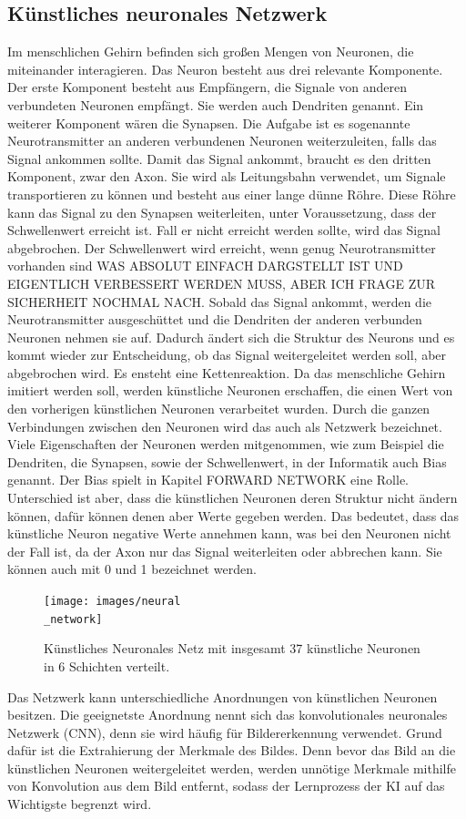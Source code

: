 \documentclass[11pt]{article}
\begin{document}
\subsection{Künstliches neuronales Netzwerk}
Im menschlichen Gehirn befinden sich großen Mengen von Neuronen, die miteinander interagieren. 
Das Neuron besteht aus drei relevante Komponente. Der erste Komponent besteht aus Empfängern, die Signale von anderen verbundeten Neuronen empfängt.
Sie werden auch Dendriten genannt. Ein weiterer Komponent wären die Synapsen. Die Aufgabe ist es sogenannte Neurotransmitter an anderen verbundenen Neuronen
weiterzuleiten, falls das Signal ankommen sollte. Damit das Signal ankommt, braucht es den dritten Komponent, zwar den Axon. Sie wird als Leitungsbahn
verwendet, um Signale transportieren zu können und besteht aus einer lange dünne Röhre. Diese Röhre kann das Signal zu den Synapsen weiterleiten, unter Voraussetzung, dass der Schwellenwert erreicht ist.
Fall er nicht erreicht werden sollte, wird das Signal abgebrochen. Der Schwellenwert wird erreicht, wenn genug Neurotransmitter vorhanden sind
WAS ABSOLUT EINFACH DARGSTELLT IST UND EIGENTLICH VERBESSERT WERDEN MUSS, ABER ICH FRAGE ZUR SICHERHEIT NOCHMAL NACH. Sobald das Signal ankommt, werden die Neurotransmitter ausgeschüttet und die Dendriten der anderen verbunden Neuronen nehmen sie auf.
Dadurch ändert sich die Struktur des Neurons und es kommt wieder zur Entscheidung, ob das Signal weitergeleitet werden soll, aber abgebrochen wird.
Es ensteht eine Kettenreaktion.
Da das menschliche Gehirn imitiert werden soll, werden künstliche Neuronen erschaffen, die einen Wert von den vorherigen künstlichen Neuronen verarbeitet wurden.
Durch die ganzen Verbindungen zwischen den Neuronen wird das auch als Netzwerk bezeichnet. Viele Eigenschaften der Neuronen werden mitgenommen, wie zum Beispiel die Dendriten, die Synapsen, sowie
der Schwellenwert, in der Informatik auch Bias genannt. Der Bias spielt in Kapitel FORWARD NETWORK eine Rolle. Unterschied ist aber,
dass die künstlichen Neuronen deren Struktur nicht ändern können, dafür können denen aber Werte gegeben werden. Das bedeutet, dass das künstliche Neuron
negative Werte annehmen kann, was bei den Neuronen nicht der Fall ist, da der Axon nur das Signal weiterleiten oder abbrechen kann. Sie können auch mit 0 und 1 bezeichnet werden.
\begin{figure}[h]
    \centering
    \texttt{[image: images/neural\\\_network]}
    \caption{Künstliches Neuronales Netz mit insgesamt 37 künstliche Neuronen in 6 Schichten verteilt.}
\end{figure}
Das Netzwerk kann unterschiedliche Anordnungen von künstlichen Neuronen besitzen. Die geeignetste Anordnung nennt sich das
konvolutionales neuronales Netzwerk (CNN), denn sie wird häufig für Bildererkennung verwendet. Grund dafür ist die Extrahierung der Merkmale
des Bildes. Denn bevor das Bild an die künstlichen Neuronen weitergeleitet werden, werden unnötige Merkmale mithilfe von Konvolution aus dem Bild entfernt, sodass der
Lernprozess der KI auf das Wichtigste begrenzt wird.
\end{document}
